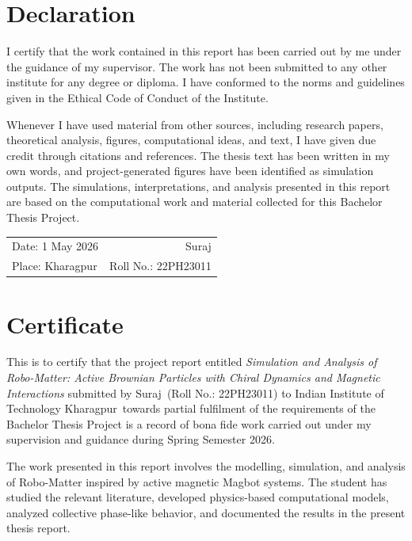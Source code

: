 \documentclass[12pt,a4paper,oneside]{report}
\newcommand{\projecttitle}{Simulation and Analysis of Robo-Matter: Active Brownian Particles with Chiral Dynamics and Magnetic Interactions}
\newcommand{\studentname}{Suraj}
\newcommand{\rollnumber}{22PH23011}
\newcommand{\institute}{Indian Institute of Technology Kharagpur}
\newcommand{\semester}{Spring Semester 2026}
\newcommand{\submissiondate}{1 May 2026}
\begin{document}
\pagestyle{fancy}

\chapter*{Declaration}
I certify that the work contained in this report has been carried out by me under the guidance of my supervisor. The work has not been submitted to any other institute for any degree or diploma. I have conformed to the norms and guidelines given in the Ethical Code of Conduct of the Institute.

Whenever I have used material from other sources, including research papers, theoretical analysis, figures, computational ideas, and text, I have given due credit through citations and references. The thesis text has been written in my own words, and project-generated figures have been identified as simulation outputs. The simulations, interpretations, and analysis presented in this report are based on the computational work and material collected for this Bachelor Thesis Project.

\vspace{1.5cm}
\begin{tabularx}{\textwidth}{@{}X r@{}}
Date: \submissiondate & \studentname \\
Place: Kharagpur & Roll No.: \rollnumber
\end{tabularx}

\clearpage

\chapter*{Certificate}
This is to certify that the project report entitled \textit{\projecttitle} submitted by \studentname\ (Roll No.: \rollnumber) to \institute\ towards partial fulfilment of the requirements of the Bachelor Thesis Project is a record of bona fide work carried out under my supervision and guidance during \semester.

The work presented in this report involves the modelling, simulation, and analysis of Robo-Matter inspired by active magnetic Magbot systems. The student has studied the relevant literature, developed physics-based computational models, analyzed collective phase-like behavior, and documented the results in the present thesis report.
\end{document}
